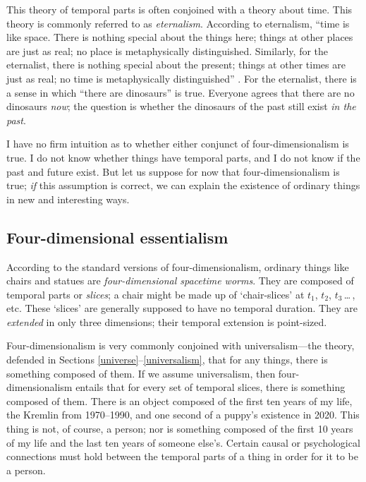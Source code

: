 \documentclass[11pt]{article}
\begin{document}
\begin{spacing}{1.5}
This theory of temporal parts is often conjoined with a theory about
time.  This theory is commonly referred to as {\em eternalism}.
According to eternalism, ``time is like space.  There is nothing
special about the things here; things at other places are just as
real; no place is metaphysically distinguished.  Similarly, for the
eternalist, there is nothing special about the present; things at
other times are just as real; no time is metaphysically
distinguished'' \citep[122]{hinchliff1996}.  For the eternalist, there
is a sense in which ``there are dinosaurs'' is true.  Everyone agrees
that there are no dinosaurs {\em now}; the question is whether the
dinosaurs of the past still exist {\em in the past}.  

I have no firm intuition as to whether either conjunct of
four-dimensionalism is true.  I do not know whether things have
temporal parts, and I do not know if the past and future exist.  But
let us suppose for now that four-dimensionalism is true; {\em if} this
assumption is correct, we can explain the existence of ordinary things
in new and interesting ways.

\subsection{Four-dimensional essentialism}
\label{4de}
According to the standard versions of four-dimensionalism, ordinary
things like chairs and statues are {\em four-dimensional spacetime
  worms}.  They are composed of temporal parts or {\em slices}; a
chair might be made up of `chair-slices' at $t_{1}$, $t_{2}$,
$t_{3}$\,\ldots\,, etc.  These `slices' are generally supposed to have
no temporal duration.  They are {\em extended} in only three
dimensions; their temporal extension is point-sized.

Four-dimensionalism is very commonly conjoined with universalism---the
theory, defended in Sections \ref{universe}--\ref{universalism}, that
for any things, there is something composed of them.  If we assume
universalism, then four-dimensionalism entails that for every set of
temporal slices, there is something composed of them.  There is an
object composed of the first ten years of my life, the Kremlin from
1970--1990, and one second of a puppy's existence in 2020.  This thing
is not, of course, a person; nor is something composed of the first 10
years of my life and the last ten years of someone else's.  Certain
causal or psychological connections must hold between the temporal
parts of a thing in order for it to be a person.


\end{spacing}
\end{document}
